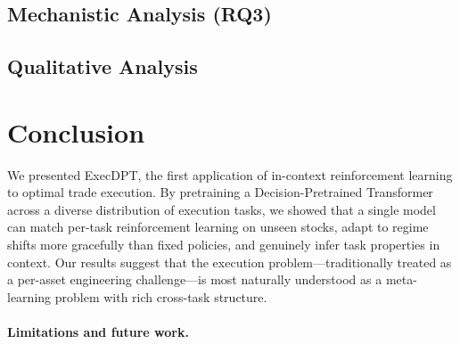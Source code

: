 \documentclass[sigconf,review,anonymous]{acmart}
\begin{document}

\subsection{Mechanistic Analysis (RQ3)}


\subsection{Qualitative Analysis}



\section{Conclusion}\label{sec:conclusion}


We presented ExecDPT, the first application of in-context reinforcement learning to optimal trade execution.
By pretraining a Decision-Pretrained Transformer across a diverse distribution of execution tasks, we showed that a single model can match per-task reinforcement learning on unseen stocks, adapt to regime shifts more gracefully than fixed policies, and genuinely infer task properties in context.
Our results suggest that the execution problem---traditionally treated as a per-asset engineering challenge---is most naturally understood as a meta-learning problem with rich cross-task structure.

\paragraph{Limitations and future work.}



\end{document}
